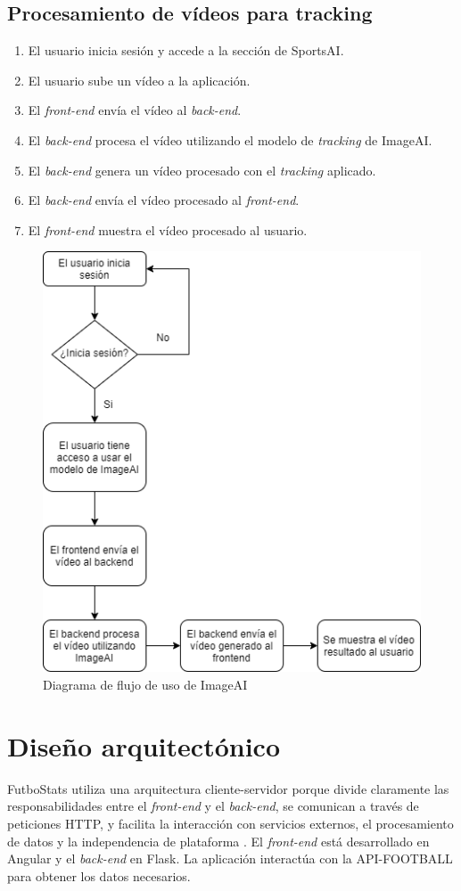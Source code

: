 \subsection{Procesamiento de vídeos para tracking}
\begin{enumerate}
    \item El usuario inicia sesión y accede a la sección de SportsAI.
    \item El usuario sube un vídeo a la aplicación.
    \item El \textit{front-end} envía el vídeo al \textit{back-end}.
    \item El \textit{back-end} procesa el vídeo utilizando el modelo de \textit{tracking} de ImageAI.
    \item El \textit{back-end} genera un vídeo procesado con el \textit{tracking} aplicado.
    \item El \textit{back-end} envía el vídeo procesado al \textit{front-end}.
    \item El \textit{front-end} muestra el vídeo procesado al usuario. 
\end{enumerate}

\begin{figure}[H]
    \centering
    \includegraphics[width=0.7\linewidth]{img/flujo4.png}
    \caption{Diagrama de flujo de uso de ImageAI}
    \label{fig:enter-label}
\end{figure}

\section{Diseño arquitectónico}
FutboStats utiliza una arquitectura cliente-servidor porque divide claramente las responsabilidades entre el \textit{front-end} y el \textit{back-end}, se comunican a través de peticiones HTTP, y facilita la interacción con servicios externos, el procesamiento de datos y la independencia de plataforma \cite{web:clienteServidor}. El \textit{front-end} está desarrollado en Angular y el \textit{back-end} en Flask. La aplicación interactúa con la API-FOOTBALL para obtener los datos necesarios.
